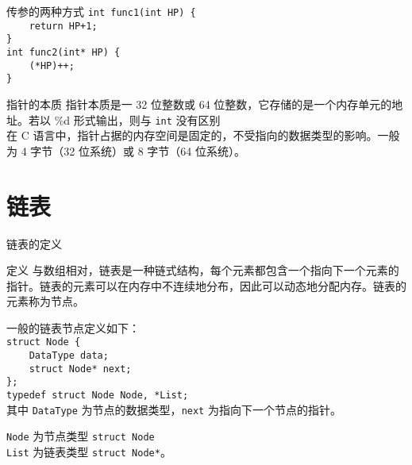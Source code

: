 \documentclass{beamer}
\begin{document}
\begin{frame}{传参的两种方式}
    \texttt{int func1(int HP) \{} \\
    \texttt{\ \ \ \ return HP+1;} \\
    \texttt{\}} \\
    \texttt{int func2(int* HP) \{} \\
    \texttt{\ \ \ \ (*HP)++;} \\
    \texttt{\}} \\
\end{frame}

\begin{frame}{指针的本质}
    指针本质是一 32 位整数或 64 位整数，它存储的是一个内存单元的地址。若以 \textsf{\%d} 形式输出，则与 \texttt{int} 没有区别 \\

    在 C 语言中，指针占据的内存空间是固定的，不受指向的数据类型的影响。一般为 4 字节（32 位系统）或 8 字节（64 位系统）。\\

    
\end{frame}


\section{链表}
\begin{frame}{链表的定义}
    \begin{block}{定义}
        与数组相对，链表是一种链式结构，每个元素都包含一个指向下一个元素的指针。链表的元素可以在内存中不连续地分布，因此可以动态地分配内存。链表的元素称为节点。
    \end{block}
    一般的链表节点定义如下： \\
    \texttt{struct Node \{} \\
    \texttt{\ \ \ \ DataType data;} \\
    \texttt{\ \ \ \ struct Node* next;} \\
    \texttt{\};} \\
    \texttt{typedef struct Node Node, *List;} \\
    其中 \texttt{DataType} 为节点的数据类型，\texttt{next} 为指向下一个节点的指针。

    \texttt{Node} 为节点类型 \texttt{struct Node}\\
    \texttt{List} 为链表类型 \texttt{struct Node*}。
\end{frame}
\end{document}
